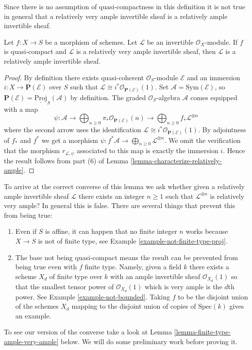 \noindent
Since there is no assumption of quasi-compactness in this definition it is not
true in general that a relatively very ample invertible sheaf is a relatively
ample invertible sheaf.

\begin{lemma}
\label{lemma-ample-very-ample}
Let $f : X \to S$ be a morphism of schemes.
Let $\mathcal{L}$ be an invertible $\mathcal{O}_X$-module.
If $f$ is quasi-compact and $\mathcal{L}$ is a relatively
very ample invertible sheaf, then $\mathcal{L}$ is a relatively
ample invertible sheaf.
\end{lemma}

\begin{proof}
By definition there exists quasi-coherent $\mathcal{O}_S$-module
$\mathcal{E}$ and an immersion $i : X \to \mathbf{P}(\mathcal{E})$
over $S$ such that
$\mathcal{L} \cong i^*\mathcal{O}_{\mathbf{P}(\mathcal{E})}(1)$.
Set $\mathcal{A} = \text{Sym}(\mathcal{E})$, so
$\mathbf{P}(\mathcal{E}) = \underline{\text{Proj}}_S(\mathcal{A})$
by definition. The graded $\mathcal{O}_S$-algebra $\mathcal{A}$
comes equipped with a map
$$
\psi :
\mathcal{A} \to
\bigoplus\nolimits_{n \geq 0}
\pi_*\mathcal{O}_{\mathbf{P}(\mathcal{E})}(n) \to
\bigoplus\nolimits_{n \geq 0}
f_*\mathcal{L}^{\otimes n}
$$
where the second arrow uses the identification
$\mathcal{L} \cong i^*\mathcal{O}_{\mathbf{P}(\mathcal{E})}(1)$.
By adjointness of $f_*$ and $f^*$ we get a morphism
$\psi : f^*\mathcal{A} \to \bigoplus_{n \geq 0}\mathcal{L}^{\otimes n}$.
We omit the verification that the morphism $r_{\mathcal{L}, \psi}$
associated to this map is exactly the immersion $i$.
Hence the result follows from
part (6) of Lemma \ref{lemma-characterize-relatively-ample}.
\end{proof}

\noindent
To arrive at the correct converse of this lemma we ask
whether given a relatively ample
invertible sheaf $\mathcal{L}$ there exists an integer $n \geq 1$ such
that $\mathcal{L}^{\otimes n}$ is relatively very ample? In general this
is false. There are several things that prevent this from being true:
\begin{enumerate}
\item Even if $S$ is affine, it can happen that no finite integer
$n$ works because $X \to S$ is not of finite type, see
Example \ref{example-not-finite-type-proj}.
\item The base not being quasi-compact means the result can be
prevented from being true even with $f$ finite type. Namely, given
a field $k$ there exists a scheme $X_d$ of finite type over $k$ with
an ample invertible sheaf $\mathcal{O}_{X_d}(1)$ so that the smallest
tensor power of $\mathcal{O}_{X_d}(1)$ which is very ample is the $d$th
power. See Example \ref{example-not-bounded}.
Taking $f$ to be the disjoint union of the schemes $X_d$ mapping
to the disjoint union of copies of $\text{Spec}(k)$ gives an example.
\end{enumerate}
To see our version of the converse take a look at
Lemma \ref{lemma-finite-type-ample-very-ample} below.
We will do some preliminary work before proving it.

